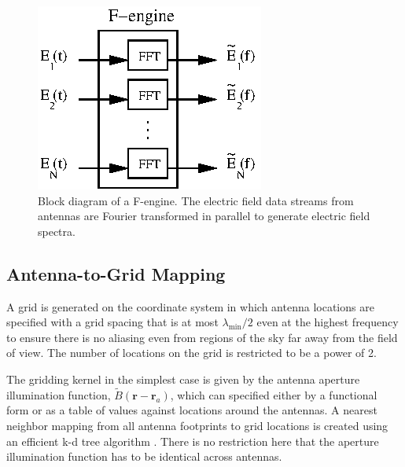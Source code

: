 \documentclass[a4paper,fleqn,usenatbib]{../mnras}
\begin{document}
\begin{figure}
  \includegraphics[width=\columnwidth]{F-engine.eps}
  \caption{Block diagram of a F-engine. The electric field data streams from
    antennas are Fourier transformed in parallel to generate electric field
    spectra.}
  \label{fig:f-engine}
\end{figure}

\subsection{Antenna-to-Grid Mapping}

A grid is generated on the coordinate system in which antenna locations are
specified with a grid spacing that is at most $\lambda_\textrm{min}/2$ even at the
highest frequency to ensure there is no aliasing even from regions of the sky far
away from the field of view. The number of locations on the grid is restricted to
be a power of 2. 

The gridding kernel in the simplest case is given by the antenna aperture
illumination function, $\widetilde{B}(\mathbf{r}-\mathbf{r}_a)$, which can
specified either by a functional form or as a table of values against locations
around the antennas. A nearest neighbor mapping from all antenna footprints to
grid locations is created using an efficient k-d tree algorithm \citep{man99}.
There is no restriction here that the aperture illumination function has to be
identical across antennas. 
\end{document}
